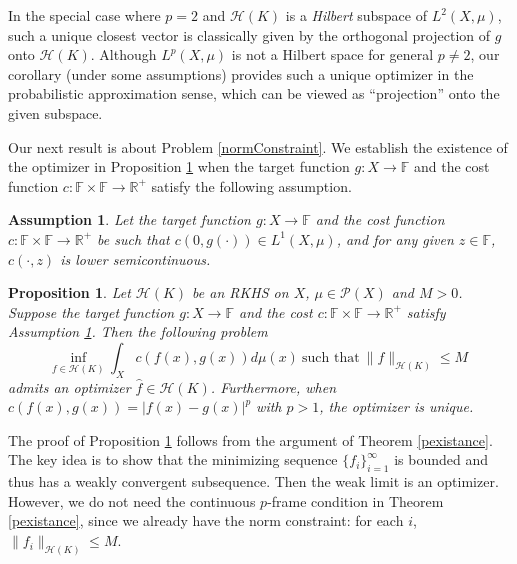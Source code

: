 \documentclass{amsart}
\numberwithin{equation}{section}
\theoremstyle{plain}
\newtheorem{proposition}[subsection]{Proposition}
\newtheorem{assumption}[subsection]{Assumption}
\theoremstyle{remark}
\theoremstyle{definition}
\begin{document}
In the special case where $p=2$ and $\mathscr{H}(K)$ is a \textit{Hilbert} subspace of $L^2(X,\mu)$, such a unique closest vector is classically given by the orthogonal projection of $g$ onto $\mathscr{H}(K)$.
Although $L^p(X,\mu)$ is not a Hilbert space for general $p\neq 2$, our corollary (under some assumptions) provides such a unique optimizer in the probabilistic approximation sense, which can be viewed as ``projection'' onto the given subspace.

Our next result is about Problem \ref{normConstraint}. We establish the existence of the optimizer in Proposition \ref{constrain:muPenaltyThm} when the target function $g: X \to \mathbb{F}$ and the cost function $c:\mathbb{F} \times \mathbb{F} \rightarrow \mathbb{R}^{+}$ satisfy the following assumption.
\begin{assumption}\label{assumption: g and c}
    Let the target function $g:X\to \mathbb{F}$ and the cost function $c:\mathbb{F} \times \mathbb{F} \rightarrow \mathbb{R}^{+}$ be such that 
$c(0, g(\cdot)) \in L^1(X,\mu)$, and for any given $z \in \mathbb{F}$, $c(\cdot,z)$ is lower semicontinuous.
\end{assumption}

\begin{proposition}\label{constrain:muPenaltyThm}
Let $\mathscr{H}(K)$ be an RKHS on $X$, $\mu \in \mathscr{P}(X)$ and $M>0$.
Suppose the target function $g:X\to \mathbb{F}$ and the cost $c:\mathbb{F} \times \mathbb{F} \rightarrow \mathbb{R}^{+}$ satisfy Assumption \ref{assumption: g and c}.
Then the following problem
\begin{equation*}
    \underset{f \in \mathscr{H}(K)}{\text{inf}} \ \int_{X} c(f(x),g(x))  d\mu(x) \  \text{such that} \ \|f\|_{\mathscr{H}(K)} \leq M
\end{equation*}
admits an optimizer $\hat{f} \in \mathscr{H}(K)$. 
Furthermore, %
when $c(f(x),g(x)) = |f(x)-g(x)|^p$ with $p>1$, the optimizer is unique. 
\end{proposition}

The proof of Proposition \ref{constrain:muPenaltyThm} follows from the argument of Theorem \ref{pexistance}. The key idea is to show that the minimizing sequence $\{f_i\}_{i=1}^{\infty}$ is bounded and thus has a weakly convergent subsequence. Then the weak limit is an optimizer. However, we do not need the continuous $p$-frame condition in Theorem \ref{pexistance}, since we already have the norm constraint: for each $i$, $\|f_i\|_{\mathscr{H}(K)} \leq M$. 
\end{document}

